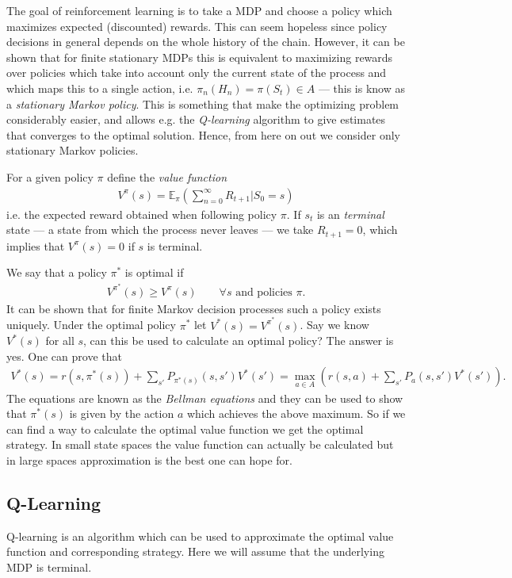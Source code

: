 The goal of reinforcement learning is to take a MDP and choose a policy which maximizes expected (discounted) rewards. This can seem hopeless since policy decisions in general depends on the whole history of the chain. However, it can be shown that for finite stationary MDPs this is equivalent to maximizing rewards over policies which take into account only the current state of the process and which maps this to a single action, i.e. $\pi_n(H_n) = \pi (S_t)\in A$ --- this is know as a \textit{stationary Markov policy}. This is something that make the optimizing problem considerably easier, and allows e.g. the \textit{Q-learning} algorithm to give estimates that converges to the optimal solution. Hence, from here on out we consider only stationary Markov policies.


For a given policy $\pi$ define the \textit{value function}
\begin{align*}
	V^{\pi}(s) = \mathbb{E}_{\pi}( \sum_{n=0}^{\infty} R_{t+1} | S_0 = s)
\end{align*}
i.e. the expected reward obtained when following policy $\pi$. If $s_t$ is an \textit{terminal} state --- a state from which the process never leaves --- we take $R_{t+1} = 0$, which implies that $V^{\pi}(s) = 0$ if $s$ is terminal.

We say that a policy $\pi^*$ is optimal if 
\begin{align*}
	V^{\pi^*}(s) \geq V^{\pi}(s)\qquad \forall s \text{ and policies }\pi.
\end{align*}
It can be shown that for finite Markov decision processes such a policy exists uniquely. Under the optimal policy $\pi^*$ let $V^*(s) = V^{\pi^*}(s)$.
Say we know $V^*(s)$ for all $s$, can this be used to calculate an optimal policy? The answer is yes. One can prove that
\begin{align*}
	V^*(s) =  r(s, \pi^*(s)) + \sum_{s'} P_{\pi^*(s)}(s,s')V^*(s') = \max_{a \in A} ( r(s, a) + \sum_{s'} P_{a}(s,s')V^*(s') ).
\end{align*}
The equations are known as the \textit{Bellman equations} and they can be used to show that $\pi^*(s)$ is given by the action $a$ which achieves the above maximum. So if we can find a way to calculate the optimal value function we get the optimal strategy. In small state spaces the value function can actually be calculated but in large spaces approximation is the best one can hope for.

\subsection*{Q-Learning}
Q-learning is an algorithm which can be used to approximate the optimal value function and corresponding strategy. Here we will assume that the underlying MDP is terminal.

